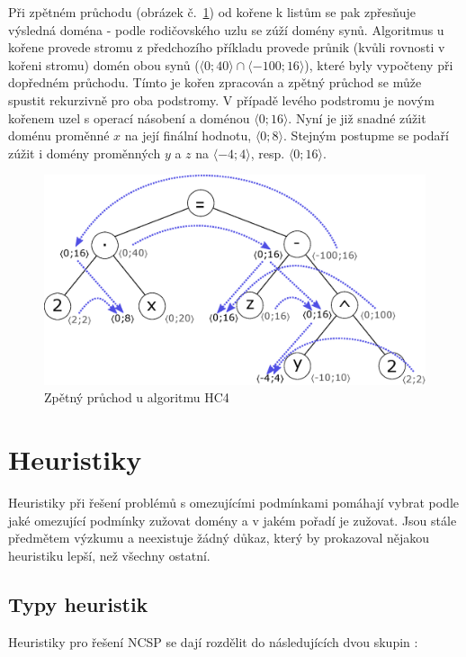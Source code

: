 Při zpětném průchodu (obrázek č.~\ref{img:backwardPropag}) od kořene k listům se pak zpřesňuje výsledná doména - podle rodičovského uzlu se zúží domény synů. Algoritmus u kořene provede stromu z předchozího příkladu provede průnik (kvůli rovnosti v kořeni stromu) domén obou synů ($\langle 0;40\rangle \cap \langle -100;16\rangle$), které byly vypočteny při dopředném průchodu. Tímto je kořen zpracován a zpětný průchod se může spustit rekurzivně pro oba podstromy. V případě levého podstromu je novým kořenem uzel s operací násobení a doménou $\langle 0;16 \rangle$. Nyní je již snadné zúžit doménu proměnné $x$ na její finální hodnotu, $\langle 0;8 \rangle$. Stejným postupme se podaří zúžit i domény proměnných $y$ a $z$ na $\langle -4;4 \rangle$, resp. $\langle 0;16 \rangle$.

\begin{figure}
\label{img:backwardPropag}
\centering
\includegraphics[scale=.65]{img/backwardPropag.eps}
\caption{Zpětný průchod u algoritmu HC4}
\end{figure}







\section{Heuristiky}
Heuristiky při řešení problémů s omezujícími podmínkami pomáhají vybrat podle jaké omezující podmínky zužovat domény a v jakém pořadí je zužovat. Jsou stále předmětem výzkumu a neexistuje žádný důkaz, který by prokazoval nějakou heuristiku lepší, než všechny ostatní. 

\subsection{Typy heuristik}
Heuristiky pro řešení NCSP se dají rozdělit do následujících dvou skupin \cite{feiten10}:

